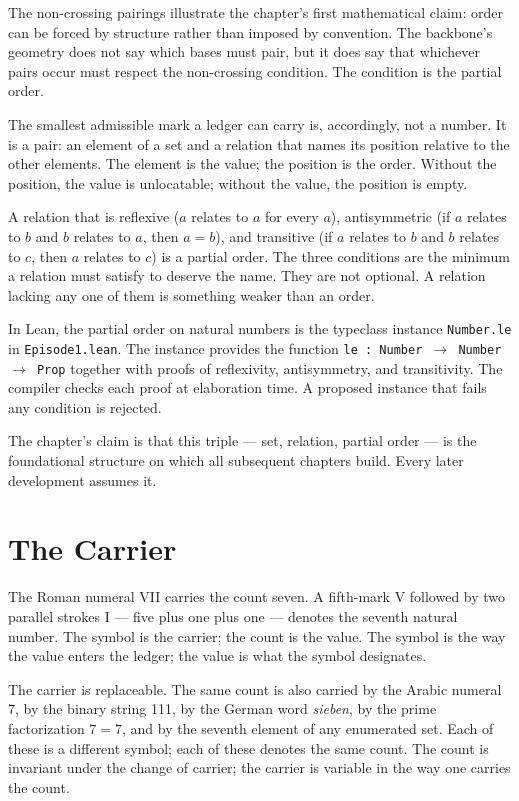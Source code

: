 The non-crossing pairings illustrate the chapter's first mathematical claim:
order can be forced by structure rather than imposed by convention. The
backbone's geometry does not say which bases must pair, but it does say that
whichever pairs occur must respect the non-crossing condition. The condition
is the partial order.

The smallest admissible mark a ledger can carry is, accordingly, not a
number. It is a pair: an element of a set and a relation that names its
position relative to the other elements. The element is the value; the
position is the order. Without the position, the value is unlocatable;
without the value, the position is empty.

A relation that is reflexive ($a$ relates to $a$ for every $a$), antisymmetric
(if $a$ relates to $b$ and $b$ relates to $a$, then $a = b$), and transitive
(if $a$ relates to $b$ and $b$ relates to $c$, then $a$ relates to $c$) is a
partial order. The three conditions are the minimum a relation must satisfy
to deserve the name. They are not optional. A relation lacking any one of
them is something weaker than an order.

In Lean, the partial order on natural numbers is the typeclass instance
\texttt{Number.le} in \texttt{Episode1.lean}. The instance provides the
function \texttt{le : Number $\to$ Number $\to$ Prop} together with proofs
of reflexivity, antisymmetry, and transitivity. The compiler checks each
proof at elaboration time. A proposed instance that fails any condition is
rejected.

The chapter's claim is that this triple --- set, relation, partial order ---
is the foundational structure on which all subsequent chapters build. Every
later development assumes it.

\section{The Carrier}
\label{se:the-carrier}

The Roman numeral VII carries the count seven. A fifth-mark V
followed by two parallel strokes I --- five plus one plus one ---
denotes the seventh natural number. The symbol is the carrier; the
count is the value. The symbol is the way the value enters the
ledger; the value is what the symbol designates.

The carrier is replaceable. The same count is also carried by the Arabic
numeral 7, by the binary string 111, by the German word \emph{sieben}, by
the prime factorization $7 = 7$, and by the seventh element of any
enumerated set. Each of these is a different symbol; each of these denotes
the same count. The count is invariant under the change of carrier; the
carrier is variable in the way one carries the count.

